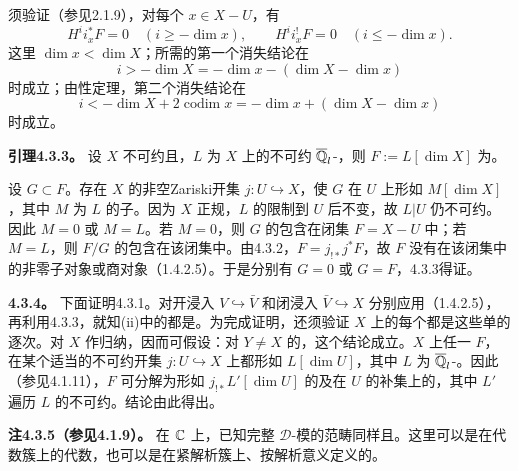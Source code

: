 须验证（参见2.1.9），对每个 $x\in X-U$，有
\[H^ii_x^*F=0\quad(i\ge-\dim x),\qquad H^ii_x^!F=0\quad(i\le-\dim x).\]
这里 $\dim x<\dim X$；所需的第一个消失结论在
\[i>-\dim X=-\dim x-(\dim X-\dim x)\]
时成立；由性定理，第二个消失结论在
\[i<-\dim X+2\operatorname{codim}x=-\dim x+(\dim X-\dim x)\]
时成立。

\par\medskip\noindent\textbf{引理4.3.3。} 设 $X$ 不可约且，$L$ 为 $X$ 上的不可约 $\overline{\mathbb Q}_l$-，则 $F:=L[\dim X]$ 为。

设 $G\subset F$。存在 $X$ 的非空Zariski开集 $j:U\hookrightarrow X$，使 $G$ 在 $U$ 上形如 $M[\dim X]$，其中 $M$ 为 $L$ 的子。因为 $X$ 正规，$L$ 的限制到 $U$ 后不变，故 $L|U$ 仍不可约。因此 $M=0$ 或 $M=L$。若 $M=0$，则 $G$ 的包含在闭集 $F=X-U$ 中；若 $M=L$，则 $F/G$ 的包含在该闭集中。由4.3.2，$F=j_{!*}j^*F$，故 $F$ 没有在该闭集中的非零子对象或商对象（1.4.2.5）。于是分别有 $G=0$ 或 $G=F$，4.3.3得证。

\par\medskip\noindent\textbf{4.3.4。} 下面证明4.3.1。对开浸入 $V\hookrightarrow\bar V$ 和闭浸入 $\bar V\hookrightarrow X$ 分别应用（1.4.2.5），再利用4.3.3，就知(ii)中的都是。为完成证明，还须验证 $X$ 上的每个都是这些单的逐次。对 $X$ 作归纳，因而可假设：对 $Y\ne X$ 的，这个结论成立。$X$ 上任一 $F$，在某个适当的不可约开集 $j:U\hookrightarrow X$ 上都形如 $L[\dim U]$，其中 $L$ 为 $\overline{\mathbb Q}_l$-。因此（参见4.1.11），$F$ 可分解为形如 $j_{!*}L'[\dim U]$ 的及在 $U$ 的补集上的，其中 $L'$ 遍历 $L$ 的不可约。结论由此得出。

\par\medskip\noindent\textbf{注4.3.5（参见4.1.9）。} 在 $\mathbb C$ 上，已知完整 $\mathscr D$-模的范畴同样且。这里可以是在代数簇上的代数，也可以是在紧解析簇上、按解析意义定义的。

